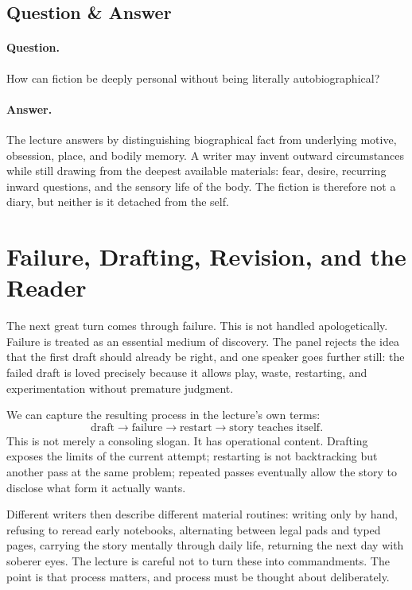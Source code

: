 \subsection{Question \& Answer}

\paragraph{Question.} How can fiction be deeply personal without being literally autobiographical?

\paragraph{Answer.} The lecture answers by distinguishing biographical fact from underlying motive, obsession, place, and bodily memory. A writer may invent outward circumstances while still drawing from the deepest available materials: fear, desire, recurring inward questions, and the sensory life of the body. The fiction is therefore not a diary, but neither is it detached from the self.

\section{Failure, Drafting, Revision, and the Reader}

The next great turn comes through failure. This is not handled apologetically. Failure is treated as an essential medium of discovery. The panel rejects the idea that the first draft should already be right, and one speaker goes further still: the failed draft is loved precisely because it allows play, waste, restarting, and experimentation without premature judgment.

We can capture the resulting process in the lecture's own terms:
\begin{equation}
\text{draft} \to \text{failure} \to \text{restart} \to \text{story teaches itself}.
\end{equation}
This is not merely a consoling slogan. It has operational content. Drafting exposes the limits of the current attempt; restarting is not backtracking but another pass at the same problem; repeated passes eventually allow the story to disclose what form it actually wants.

Different writers then describe different material routines: writing only by hand, refusing to reread early notebooks, alternating between legal pads and typed pages, carrying the story mentally through daily life, returning the next day with soberer eyes. The lecture is careful not to turn these into commandments. The point is that process matters, and process must be thought about deliberately.

